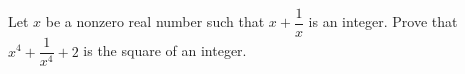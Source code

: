 Let $x$ be a nonzero real number such that $x+\dfrac{1}{x}$ is an integer. Prove that $x^4+\dfrac{1}{x^4}+2$ is the square of an integer.
